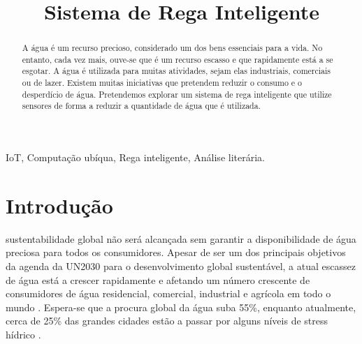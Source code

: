 \documentclass[conference]{IEEEtran}
\begin{document}
\title{Sistema de Rega Inteligente}

\author{
\and
{}
}

\maketitle

\begin{abstract}
A água é um recurso precioso, considerado um dos bens essenciais para a vida. 
No entanto, cada vez mais, ouve-se que é um recurso escasso e que rapidamente está a se esgotar. 
A água é utilizada para muitas atividades, sejam elas industriais, comerciais ou de lazer. 
Existem muitas iniciativas que pretendem reduzir o consumo e o desperdício de água. 
Pretendemos explorar um sistema de rega inteligente que utilize sensores de forma a 
reduzir a quantidade de água que é utilizada. \\
\end{abstract}

\begin{IEEEkeywords}
IoT, Computação ubíqua, Rega inteligente, Análise literária.
\end{IEEEkeywords}

\section{Introdução}
 sustentabilidade global não será alcançada sem garantir a 
disponibilidade de água preciosa para todos os consumidores. Apesar de ser um 
dos principais objetivos da agenda da UN2030 \cite{un2015agenda} para o desenvolvimento global sustentável, 
a atual escassez de água está a crescer rapidamente e afetando um número crescente de consumidores 
de água residencial, comercial, industrial e agrícola em todo o mundo \cite{mishra2021water}. Espera-se que a procura 
global da água suba 55\%, enquanto atualmente, cerca de 25\% das grandes cidades estão a passar 
por alguns níveis de stress hídrico \cite{josefine2021differentiated}.
\end{document}
